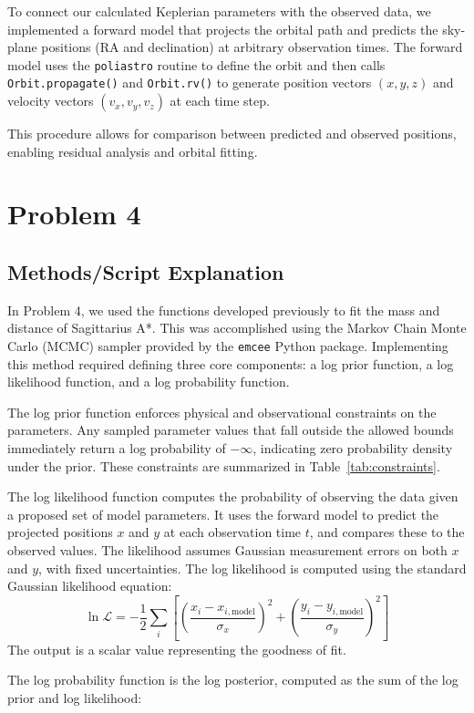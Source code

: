 \documentclass[linenumbers,trackchanges,astrosymb,]{aastex7}
\begin{document}
To connect our calculated Keplerian parameters with the observed data, we implemented a forward model that projects the orbital path and predicts the sky-plane positions (RA and declination) at arbitrary observation times. The forward model uses the \texttt{poliastro} routine to define the orbit and then calls \texttt{Orbit.propagate()} and \texttt{Orbit.rv()} to generate position vectors $(x, y, z)$ and velocity vectors $(v_x, v_y, v_z)$ at each time step.

This procedure allows for comparison between predicted and observed positions, enabling residual analysis and orbital fitting.

\section{Problem 4}
\subsection{Methods/Script Explanation}

In Problem 4, we used the functions developed previously to fit the mass and distance of Sagittarius A*. This was accomplished using the Markov Chain Monte Carlo (MCMC) sampler provided by the \texttt{emcee} Python package. Implementing this method required defining three core components: a log prior function, a log likelihood function, and a log probability function.

The log prior function enforces physical and observational constraints on the parameters. Any sampled parameter values that fall outside the allowed bounds immediately return a log probability of $-\infty$, indicating zero probability density under the prior. These constraints are summarized in Table~\ref{tab:constraints}.

The log likelihood function computes the probability of observing the data given a proposed set of model parameters. It uses the forward model to predict the projected positions $x$ and $y$ at each observation time $t$, and compares these to the observed values. The likelihood assumes Gaussian measurement errors on both $x$ and $y$, with fixed uncertainties. The log likelihood is computed using the standard Gaussian likelihood equation:
\[
\ln \mathcal{L} = -\frac{1}{2} \sum_{i} \left[ \left(\frac{x_i - x_{i,\text{model}}}{\sigma_x}\right)^2 + \left(\frac{y_i - y_{i,\text{model}}}{\sigma_y}\right)^2 \right]
\]
The output is a scalar value representing the goodness of fit.

The log probability function is the log posterior, computed as the sum of the log prior and log likelihood:
\end{document}
